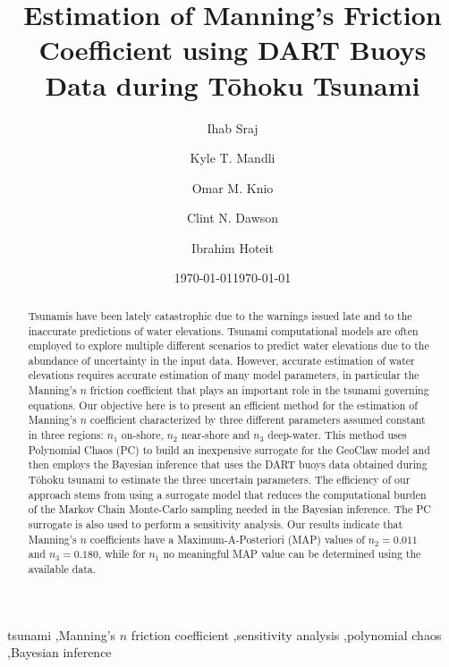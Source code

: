 \documentclass[preprint,12pt]{elsarticle}
\newcommand{\geoclaw}{{\sc GeoClaw}\xspace}
\newcommand{\tohoku}{T\={o}hoku\xspace}
\begin{document}
\ifpdf
{}
\else
{}
\fi

\begin{frontmatter}

\title{Estimation of Manning's Friction Coefficient using DART Buoys Data during
\tohoku Tsunami}
\date{\today}

\author[kaust]{Ihab Sraj}
\author[ut]{Kyle T. Mandli}
\author[duke]{Omar M. Knio}
\author[ut]{Clint N. Dawson}
\author[kaust]{Ibrahim Hoteit}

\address[kaust]{Department of Physical Sciences and Engineering, King Abdullah University for Science and Technology, Thuwal, Saudi Arabia}
\address[ut]{Institute for Computational Engineering and Science, University of Texas at Austin, 201 E 24th ST. Stop C0200, Austin, TX 78712-1229, USA}
\address[duke]{Department of Mechanical Engineering and Materials Science, Duke University, 144
Hudson Hall, Durham, North Carolina 27708, USA}
\date{\today}

\begin{abstract}

Tsunamis have been lately catastrophic due to the warnings
issued late and to the inaccurate predictions of water elevations. 
Tsunami computational models are often employed to explore multiple 
different scenarios to predict water elevations due to the abundance 
of uncertainty in the input data. However, accurate estimation of water elevations 
requires accurate estimation of many model parameters,
in particular the Manning's $n$ friction coefficient that plays an important role in the 
tsunami governing equations. Our objective here is to present an efficient method for the 
estimation of Manning's $n$ coefficient characterized by three different parameters 
assumed constant in three regions: $n_1$ on-shore, $n_2$ near-shore and $n_3$ deep-water. 
This method uses Polynomial Chaos (PC) to build an inexpensive surrogate for the 
\geoclaw model and then employs the Bayesian inference that uses the DART buoys data
obtained during \tohoku tsunami to estimate the three uncertain parameters. The efficiency of our approach stems from 
using a surrogate model that reduces the computational burden of the Markov Chain Monte-Carlo 
sampling needed in the Bayesian inference. The PC surrogate is also used to perform a sensitivity analysis. 
Our results indicate that Manning's $n$ coefficients have a Maximum-A-Posteriori (MAP) values of $n_2=0.011$ and $n_3=0.180$, while for $n_1$ no meaningful MAP value can be determined using the available data. 


\end{abstract}

\begin{keyword}
tsunami \sep Manning's $n$ friction coefficient \sep sensitivity analysis \sep polynomial chaos \sep Bayesian inference
\end{keyword}

\end{frontmatter}
\end{document}

